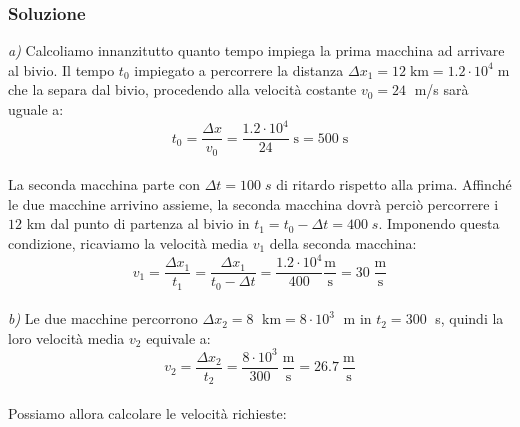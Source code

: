 \documentclass[12pt,a4paper]{book}
\begin{document}
\subsubsection*{Soluzione}
\emph{a)} Calcoliamo innanzitutto quanto tempo impiega la prima macchina ad arrivare al bivio. Il tempo $t_0$ impiegato a percorrere la distanza $\Delta x_1 = 12 \; \text{km} = 1.2 \cdot 10^4 \; \text{m}$ che la separa dal bivio, procedendo alla velocità costante $v_0 = 24 \;$ m/s sarà uguale a:\\
\begin{equation*}
t_0 = \frac{\Delta x}{v_0}= \frac{1.2 \cdot 10^4}{24} \; \text{s} = 500 \; \text{s}
\end{equation*}\\
La seconda macchina parte con $\Delta t = 100 \; s$ di ritardo rispetto alla prima. Affinché le due macchine arrivino assieme, la seconda macchina dovrà perciò percorrere i $12$ km dal punto di partenza al bivio in $t_1=t_0-\Delta t = 400 \; s$. Imponendo questa condizione, ricaviamo la velocità media $v_1$ della seconda macchina:\\
\begin{equation*}
v_1= \frac{\Delta x_1}{t_1}=\frac{\Delta x_1}{t_0 - \Delta t}= \frac{1.2 \cdot 10^4}{400}\frac{\text{m}}{\text{s}} = 30 \; \frac{\text{m}}{\text{s}}
\end{equation*}\\
\emph{b)} Le due macchine percorrono $\Delta x_2=8 \;$ km$ = 8\cdot 10^3 \;$ m in $t_2=300 \;$ s, quindi la loro velocità media $v_2$ equivale a:\\
\begin{equation*}
v_2=\frac{\Delta x_2}{t_2}=\frac{8\cdot 10^3}{300} \: \frac{\text{m}}{\text{s}}=26.7 \: \frac{\text{m}}{\text{s}}
\end{equation*}\\
Possiamo allora calcolare le velocità richieste:
\end{document}
